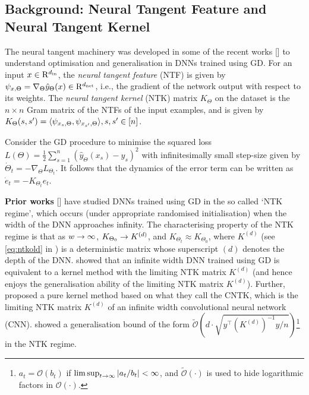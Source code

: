 \documentclass{article}
\begin{document}
\subsection{Background: Neural Tangent Feature and Neural Tangent Kernel}\label{sec:background}
The neural tangent machinery was developed in some of the recent works [] to understand optimisation and generalisation in DNNs trained using GD. For an input $x\in\mathrm{R}^{d_{\text{in}}}$, the \emph{neural tangent feature} (NTF) is given by $\psi_{x,\Theta}=\nabla_{\Theta}\hat{y}_{\Theta}(x)\in\mathrm{R}^{d_{\text{net}}}$, i.e.,  the gradient of the network output with respect to its weights. The \emph{neural tangent kernel} (NTK) matrix $K_{\Theta}$ on the dataset is the $n\times n$ Gram matrix of the NTFs of the input examples, and is given by $K_{\Theta}(s,s')=\langle \psi_{x_s,\Theta},\psi_{x_{s'},\Theta}\rangle, s,s'\in[n]$. 
\begin{proposition}\label{prop:basic}
Consider the GD procedure to minimise the  squared loss $L(\Theta)=\frac{1}{2}\sum_{s=1}^n \left(\hat{y}_{\Theta}(x_s)-y_s\right)^2$ with infinitesimally small step-size given by $\dot{\Theta}_t=-\nabla_{\Theta}L_{\Theta_t}$. It follows that the dynamics of the error term can be written as $\dot{e}_t=-K_{\Theta_t} e_t$. 
\end{proposition}

\textbf{Prior works} [] have studied DNNs trained using GD in the so called `NTK regime', which occurs (under appropriate randomised initialisation) when the width of the DNN approaches infinity. The characterising property of the NTK regime is that as $w\rightarrow\infty$, $K_{\Theta_0}\rightarrow K^{(d)}$, and $K_{\Theta_t}\approx K_{\Theta_0}$, where $K^{(d)}$ (see \eqref{eq:ntkold} in ) is a deterministic matrix whose superscript $(d)$ denotes the depth of the DNN. \cite{arora2019exact} showed that an infinite width DNN trained using GD is equivalent to a kernel method with the limiting NTK matrix $K^{(d)}$ (and hence enjoys the generalisation ability of the limiting NTK matrix $K^{(d)}$). Further, \cite{arora2019exact} proposed a pure kernel method based on what they call the CNTK, which is the limiting NTK matrix $K^{(d)}$ of an infinite width convolutional neural network (CNN). \cite{cao2019generalization} showed a generalisation bound of the form $\tilde{\mathcal{O}}\left(d\cdot\sqrt{y^\top {\left(K^{(d)}\right)}^{-1} y/n}\right)$\footnote{$a_t=\mathcal{O}(b_t)$ if $\lim\sup_{t\rightarrow\infty}|a_t/b_t|<\infty$, and $\tilde{\mathcal{O}}(\cdot)$ is used to hide logarithmic factors in $\mathcal{O}(\cdot)$.} in the NTK regime. 
\end{document}
